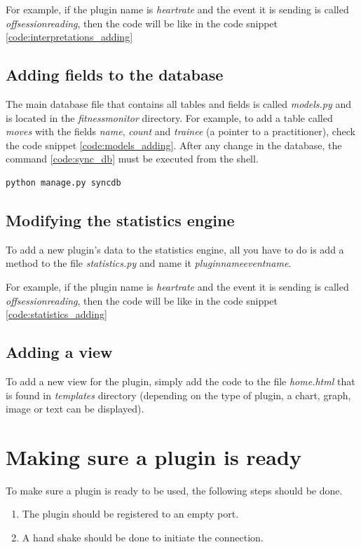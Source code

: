 For example, if the plugin name is \emph{heartrate} and the event it is sending is called \emph{offsessionreading}, then the code will be like in the code snippet \ref{code:interpretations_adding}

\label{code:interpretations_adding}

\subsection{Adding fields to the database}\label{sec:add_fields}
The main database file that contains all tables and fields is called \emph{models.py} and is located in the \emph{fitnessmonitor} directory. For example, to add a table called \emph{moves} with the fields \emph{name}, \emph{count} and \emph{trainee} (a pointer to a practitioner), check the code snippet \ref{code:models_adding}. After any change in the database, the command \ref{code:sync_db} must be executed from the shell.

\label{code:models_adding}

\begin{lstlisting}
python manage.py syncdb
\end{lstlisting}\label{code:sync_db}

\subsection{Modifying the statistics engine}\label{sec:add_statistics}
To add a new plugin's data to the statistics engine, all you have to do is add a method to the file \emph{statistics.py} and name it \emph{pluginname}\textunderscore \emph{eventname}.

For example, if the plugin name is \emph{heartrate} and the event it is sending is called \emph{offsessionreading}, then the code will be like in the code snippet \ref{code:statistics_adding}

\label{code:statistics_adding}

\subsection{Adding a view}\label{sec:add_view}
To add a new view for the plugin, simply add the code to the file \emph{home.html} that is found in \emph{templates} directory (depending on the type of plugin, a chart, graph, image or text can be displayed).

\section{Making sure a plugin is ready}\label{sec:plugin_ready}
To make sure a plugin is ready to be used, the following steps should be done.
\begin{enumerate}
\item The plugin should be registered to an empty port.
\item A hand shake should be done to initiate the connection.
\end{enumerate}